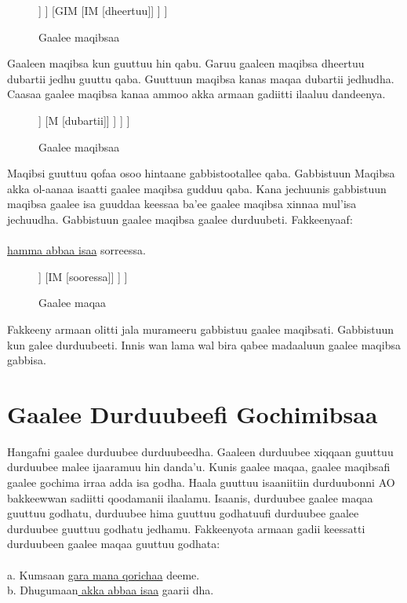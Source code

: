 \documentclass[11pt,b5paper]{book}
\begin{document}
\begin{figure}[H]										
	\caption{Gaalee maqibsaa}
	\centering
	\begin{forest}
		[GMG
			[GM1
				[M [dubartii]]
			]
			[GIM
				[IM [dheertuu]]
			]
		]
	\end{forest}
\end{figure}

Gaaleen maqibsa kun guuttuu hin qabu. Garuu gaaleen maqibsa dheertuu dubartii jedhu guuttu qaba.
Guuttuun maqibsa kanas maqaa dubartii jedhudha. Caasaa gaalee maqibsa kanaa ammoo akka armaan gadiitti ilaaluu
dandeenya. 

\begin{figure}[H]										
	\caption{Gaalee maqibsaa}
	\centering
	\begin{forest}
		[GMG
			[GIMG
				[GIM1
					[IM [dheertuu]]
					[M [dubartii]]
				]
			]
		]
	\end{forest}
\end{figure}

Maqibsi guuttuu qofaa osoo hintaane gabbistootallee qaba. Gabbistuun Maqibsa akka ol-aanaa isaatti gaalee maqibsa
gudduu qaba. Kana jechuunis gabbistuun maqibsa gaalee isa guuddaa keessaa ba’ee gaalee maqibsa xinnaa mul’isa
jechuudha. Gabbistuun gaalee maqibsa gaalee durduubeti. Fakkeenyaaf:\\
\\
\underline{hamma abbaa isaa} sorreessa.\\

\begin{figure}[H]										
	\caption{Gaalee maqaa}
	\centering
	\begin{forest}
		[GIMG
			[GIM1
				[GD [hamma abbaa isaa,roof]]
				[IM [sooressa]]
			]
		]
	\end{forest}
\end{figure}

Fakkeeny armaan olitti jala murameeru gabbistuu gaalee maqibsati. Gabbistuun kun galee durduubeeti. Innis wan lama wal bira qabee madaaluun gaalee maqibsa gabbisa.

\section{Gaalee Durduubeefi Gochimibsaa}

Hangafni gaalee durduubee durduubeedha. Gaaleen durduubee xiqqaan guuttuu durduubee malee ijaaramuu hin
danda’u. Kunis gaalee maqaa, gaalee maqibsafi gaalee gochima irraa adda isa godha. Haala guuttuu isaaniitiin durduubonni AO bakkeewwan sadiitti qoodamanii ilaalamu. Isaanis, durduubee gaalee maqaa guuttuu godhatu, durduubee hima guuttuu godhatuufi durduubee gaalee durduubee guuttuu godhatu jedhamu. Fakkeenyota armaan gadii keessatti
durduubeen gaalee maqaa guuttuu godhata:\\
\\
a. Kumsaan \underline{gara mana qorichaa} deeme.\\
b. Dhugumaan\underline{ akka abbaa isaa} gaarii dha.\\
\end{document}
